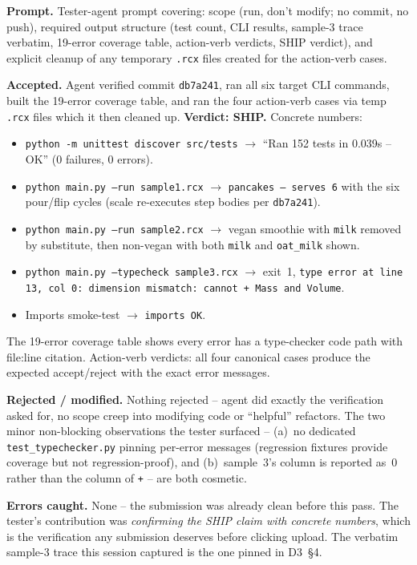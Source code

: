 \documentclass[11pt,a4paper]{article}
\newcommand{\field}[1]{\noindent\textbf{#1}}
\begin{document}
\field{Prompt.} Tester-agent prompt covering: scope (run, don't modify;
no commit, no push), required output structure (test count, CLI
results, sample-3 trace verbatim, 19-error coverage table, action-verb
verdicts, SHIP verdict), and explicit cleanup of any temporary
\texttt{.rcx} files created for the action-verb cases.

\field{Accepted.} Agent verified commit \texttt{db7a241}, ran all six
target CLI commands, built the 19-error coverage table, and ran the
four action-verb cases via temp \texttt{.rcx} files which it then
cleaned up. \textbf{Verdict: SHIP.} Concrete numbers:

\begin{itemize}[leftmargin=*,itemsep=2pt]
  \item \texttt{python -m unittest discover src/tests} $\to$ ``Ran
        152 tests in 0.039s -- OK'' (0 failures, 0 errors).
  \item \texttt{python main.py --run sample1.rcx} $\to$
        \texttt{pancakes -- serves 6} with the six pour/flip cycles
        (scale re-executes step bodies per \texttt{db7a241}).
  \item \texttt{python main.py --run sample2.rcx} $\to$ vegan smoothie
        with \texttt{milk} removed by substitute, then non-vegan with
        both \texttt{milk} and \texttt{oat\_milk} shown.
  \item \texttt{python main.py --typecheck sample3.rcx} $\to$ exit~1,
        \texttt{type error at line 13, col 0: dimension mismatch:
        cannot + Mass and Volume}.
  \item Imports smoke-test $\to$ \texttt{imports OK}.
\end{itemize}

The 19-error coverage table shows every error has a type-checker code
path with file:line citation. Action-verb verdicts: all four canonical
cases produce the expected accept/reject with the exact error messages.

\field{Rejected / modified.} Nothing rejected -- agent did exactly the
verification asked for, no scope creep into modifying code or
``helpful'' refactors. The two minor non-blocking observations the
tester surfaced -- (a)~no dedicated \texttt{test\_typechecker.py}
pinning per-error messages (regression fixtures provide coverage but
not regression-proof), and (b)~sample~3's column is reported as~0
rather than the column of \texttt{+} -- are both cosmetic.

\field{Errors caught.} None -- the submission was already clean before
this pass. The tester's contribution was \emph{confirming the SHIP
claim with concrete numbers}, which is the verification any
submission deserves before clicking upload. The verbatim sample-3
trace this session captured is the one pinned in D3~\S4.
\end{document}
